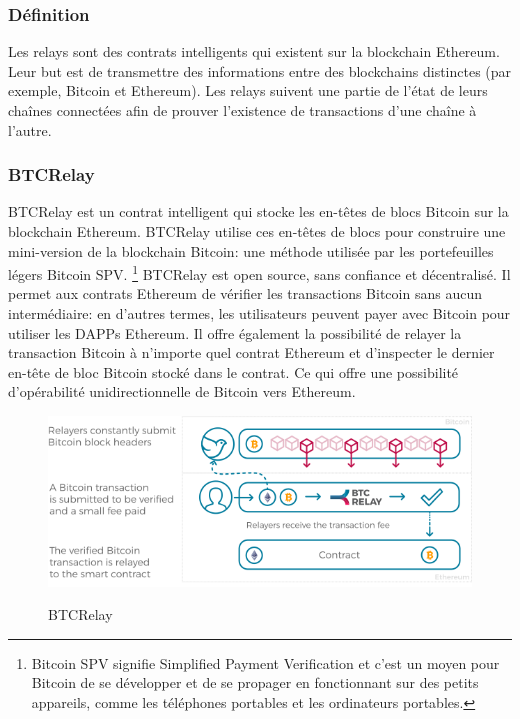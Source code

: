 \subsubsection{Définition}

Les relays sont des contrats intelligents qui existent sur la blockchain Ethereum.
Leur but est de transmettre des informations entre des blockchains distinctes (par exemple, Bitcoin et Ethereum). 
Les relays suivent une partie de l’état de leurs chaînes connectées afin de prouver l’existence de transactions d’une chaîne à l’autre.

\subsubsection{BTCRelay}

BTCRelay est un contrat intelligent qui stocke les en-têtes de blocs Bitcoin sur la blockchain Ethereum.
BTCRelay utilise ces en-têtes de blocs pour construire une mini-version de la blockchain Bitcoin: une méthode utilisée par les portefeuilles légers Bitcoin SPV. 
\footnote{Bitcoin SPV signifie Simplified Payment Verification et c’est un moyen pour Bitcoin de se développer et de se propager en fonctionnant sur des petits appareils, comme les téléphones portables et les ordinateurs portables.}
BTCRelay est open source, sans confiance et décentralisé. Il permet aux contrats Ethereum de vérifier les transactions Bitcoin sans aucun intermédiaire: en d’autres termes, 
les utilisateurs peuvent payer avec Bitcoin pour utiliser les DAPPs Ethereum. Il offre également la possibilité de relayer la transaction Bitcoin à n’importe quel contrat Ethereum et d’inspecter le dernier en-tête de bloc Bitcoin stocké dans le contrat. Ce qui offre une possibilité d'opérabilité unidirectionnelle de Bitcoin vers Ethereum.\\

\begin{figure}[h!]
  \centering
  \includegraphics[scale=0.5]{decentralisation/btcRelay.png}
  \label{fig:btcRelay}
  \caption{BTCRelay}
\end{figure}

